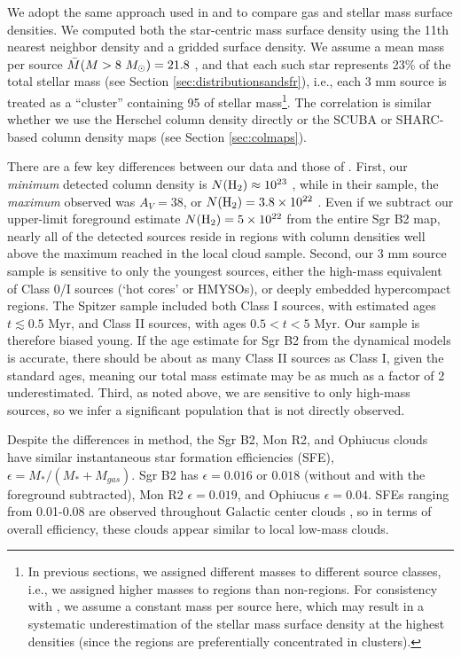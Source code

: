 \documentclass[twocolumn]{aastex61}
\begin{document}
We adopt the same approach used in \citet{Gutermuth2009a} and
\citet{Gutermuth2011a} to compare gas and stellar mass surface densities.  We
computed both the star-centric mass surface density using the 11th nearest
neighbor density and a gridded surface density.  We assume a mean mass per
source $\bar{M}(M>8~M_{\odot})=21.8$ \msun, and that each such star represents 23\%
of the total stellar mass (see Section \ref{sec:distributionsandsfr}), i.e.,
each 3 mm source is treated as a ``cluster'' containing 95 \msun of stellar
mass\footnote{In previous
sections, we assigned different masses to different source classes, i.e., we
assigned higher masses to \hii regions than non-\hii regions.  For consistency
with \citet{Gutermuth2011a}, we assume a constant mass per source here, which
may result in a systematic underestimation of the stellar mass surface density
at the highest densities (since the \hii regions are preferentially
concentrated in clusters).}. The correlation is similar whether we use the
Herschel column density directly or the SCUBA or SHARC-based column density
maps (see Section \ref{sec:colmaps}).  

There are a few key differences between our data and those of
\citet{Gutermuth2011a}.  First, our \emph{minimum} detected column density is
$N(\textrm{H}_{2})\approx10^{23}$ \persc, while in their sample, the \emph{maximum}
observed was $A_V=38$, or $N(\textrm{H}_{2})=3.8\times10^{22}$ \persc.  Even if we subtract
our upper-limit foreground estimate $N(\textrm{H}_{2})=5\times10^{22}$ from the entire
Sgr B2 map, nearly all of the detected sources reside in regions with column
densities well above the maximum reached in the local cloud sample.
Second, our 3 mm source sample is sensitive to only the youngest sources, either
the high-mass equivalent of Class 0/I sources (`hot cores' or HMYSOs), or
deeply embedded hypercompact \hii regions.  The Spitzer sample included both
Class I sources, with estimated ages $t\lesssim0.5$ Myr, and Class II sources, with
ages $0.5 < t < 5$ Myr.  Our sample is therefore biased young.  If the
age estimate for Sgr B2 from the dynamical models
\citep{Longmore2013a,Kruijssen2015a} is accurate, there should be about as many
Class II sources as Class I, given the standard ages, meaning our total mass
estimate may be as much as a factor of 2 underestimated.
Third, as noted above, we are sensitive to only high-mass sources, so we infer
a significant population that is not directly observed.

Despite the differences in method, the Sgr B2, Mon R2, and Ophiucus clouds have
similar instantaneous star formation efficiencies (SFE), $\epsilon =
M_*/(M_*+M_{gas})$.  Sgr B2 has $\epsilon=0.016$ or $0.018$ (without and with
the foreground subtracted), Mon R2 $\epsilon=0.019$, and Ophiucus $\epsilon
= 0.04$.  SFEs ranging from 0.01-0.08 are observed throughout Galactic center
clouds \citep{Barnes2017b}, so in terms of overall efficiency, these clouds
appear similar to local low-mass clouds.
\end{document}
